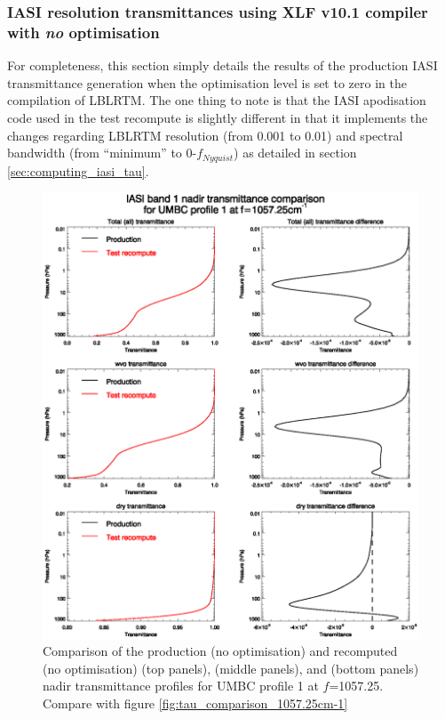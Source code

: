 \subsubsection{IASI resolution transmittances using XLF v10.1 compiler with \emph{no} optimisation}
For completeness, this section simply details the results of the production IASI transmittance generation when the optimisation level is set to zero in the compilation of LBLRTM. The one thing to note is that the IASI apodisation code used in the test recompute is slightly different in that it implements the changes regarding LBLRTM resolution (from 0.001 to 0.01\invcm) and spectral bandwidth (from ``minimum'' to 0-$f_{Nyquist}$) as detailed in section \ref{sec:computing_iasi_tau}.
\begin{figure}[htp]
  \centering
  \includegraphics[scale=0.8]{graphics/correct_tau_comparison_1057.25cm-1.eps}
  \caption{Comparison of the production (no optimisation) and recomputed (no optimisation)  (top panels),  (middle panels), and  (bottom panels) nadir transmittance profiles for UMBC profile 1 at $f$=1057.25\invcm{}. Compare with figure \ref{fig:tau_comparison_1057.25cm-1}}
  \label{fig:correct_tau_comparison_1057.25cm-1}
\end{figure}
